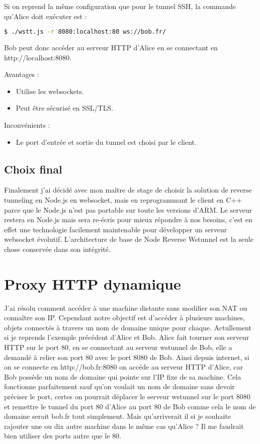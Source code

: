 \noindent Si on reprend la même configuration que pour le tunnel SSH, la commande qu'Alice doit exécuter est :
\begin{lstlisting}[language=bash]
  $ ./wstt.js -r 8080:localhost:80 ws://bob.fr/
\end{lstlisting}

Bob peut donc accéder au serveur HTTP d'Alice en se connectant en http://localhost:8080.

Avantages :
\begin{itemize}
    \item Utilise les websockets.
    \item Peut être sécurisé en SSL/TLS.
\end{itemize}

Inconvénients :
\begin{itemize}
    \item Le port d'entrée et sortie du tunnel est choisi par le client.
\end{itemize}

\subsection{Choix final}

Finalement j'ai décidé avec mon maître de stage de choisir la solution de reverse tunneling en Node.js en websocket, mais en reprogrammant le client en C++ parce que le Node.js n'est pas portable sur toute les versions d'ARM. Le serveur restera en Node.js mais sera re-écris pour mieux répondre à nos besoins, c'est en effet une technologie facilement maintenable pour développer un serveur websocket évolutif. L'architecture de base de Node Reverse Wstunnel est la seule chose conservée dans son intégrité.

\section{Proxy HTTP dynamique}

J'ai résolu comment accéder à une machine distante sans modifier son NAT ou connaître son IP. Cependant notre objectif est d'accéder à plusieurs machines, objets connectés à travers un nom de domaine unique pour chaque. Actullement si je reprends l'exemple précédent d'Alice et Bob. Alice fait tourner son serveur HTTP sur le port 80, en se connectant au serveur wstunnel de Bob, elle a demandé à relier son port 80 avec le port 8080 de Bob. Ainsi depuis internet, si on se connecte en http://bob.fr:8080 on accéde au serveur HTTP d'Alice, car Bob possède un nom de domaine qui pointe sur l'IP fixe de sa machine. Cela fonctionne parfaitement sauf qu'on voulait un nom de domaine sans devoir préciser le port, certes on pourrait déplacer le serveur wstunnel sur le port 8080 et remettre le tunnel du port 80 d'Alice au port 80 de Bob comme cela le nom de domaine serait bob.fr tout simplement. Mais qu'arriverait il si je souhaite rajouter une ou dix autre machine dans le même cas qu'Alice ? Il me faudrait bien utiliser des ports autre que le 80.

